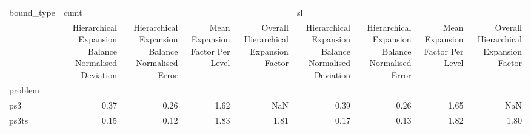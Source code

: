 \begin{tabular}{lrrrrrrrr}
\toprule
bound\_type & \multicolumn{4}{l}{cumt} & \multicolumn{4}{l}{sl} \\
{} & Hierarchical Expansion Balance Normalised Deviation & Hierarchical Expansion Balance Normalised Error & Mean Expansion Factor Per Level & Overall Hierarchical Expansion Factor & Hierarchical Expansion Balance Normalised Deviation & Hierarchical Expansion Balance Normalised Error & Mean Expansion Factor Per Level & Overall Hierarchical Expansion Factor \\
problem &                                                     &                                                 &                                 &                                       &                                                     &                                                 &                                 &                                       \\
\midrule
ps3     &                                               0.37 &                                            0.26 &                            1.62 &                                   NaN &                                               0.39 &                                            0.26 &                            1.65 &                                   NaN \\
ps3ts   &                                               0.15 &                                            0.12 &                            1.83 &                                  1.81 &                                               0.17 &                                            0.13 &                            1.82 &                                  1.80 \\
\bottomrule
\end{tabular}
